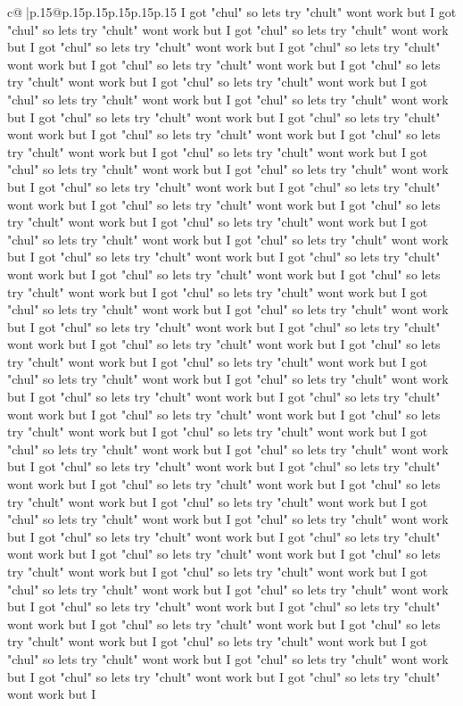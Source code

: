 \documentclass{article}
\begin{document}
{\begin{supertabular}{c@{$\;$}|p{.15\linewidth}@{}p{.15\linewidth}p{.15\linewidth}p{.15\linewidth}p{.15\linewidth}p{.15\linewidth}}
{{{I got "chul" so lets try "chult" wont work but I got "chul" so lets try "chult" wont work but I got "chul" so lets try "chult" wont work but I got "chul" so lets try "chult" wont work but I got "chul" so lets try "chult" wont work but I got "chul" so lets try "chult" wont work but I got "chul" so lets try "chult" wont work but I got "chul" so lets try "chult" wont work but I got "chul" so lets try "chult" wont work but I got "chul" so lets try "chult" wont work but I got "chul" so lets try "chult" wont work but I got "chul" so lets try "chult" wont work but I got "chul" so lets try "chult" wont work but I got "chul" so lets try "chult" wont work but I got "chul" so lets try "chult" wont work but I got "chul" so lets try "chult" wont work but I got "chul" so lets try "chult" wont work but I got "chul" so lets try "chult" wont work but I got "chul" so lets try "chult" wont work but I got "chul" so lets try "chult" wont work but I got "chul" so lets try "chult" wont work but I got "chul" so lets try "chult" wont work but I got "chul" so lets try "chult" wont work but I got "chul" so lets try "chult" wont work but I got "chul" so lets try "chult" wont work but I got "chul" so lets try "chult" wont work but I got "chul" so lets try "chult" wont work but I got "chul" so lets try "chult" wont work but I got "chul" so lets try "chult" wont work but I got "chul" so lets try "chult" wont work but I got "chul" so lets try "chult" wont work but I got "chul" so lets try "chult" wont work but I got "chul" so lets try "chult" wont work but I got "chul" so lets try "chult" wont work but I got "chul" so lets try "chult" wont work but I got "chul" so lets try "chult" wont work but I got "chul" so lets try "chult" wont work but I got "chul" so lets try "chult" wont work but I got "chul" so lets try "chult" wont work but I got "chul" so lets try "chult" wont work but I got "chul" so lets try "chult" wont work but I got "chul" so lets try "chult" wont work but I got "chul" so lets try "chult" wont work but I got "chul" so lets try "chult" wont work but I got "chul" so lets try "chult" wont work but I got "chul" so lets try "chult" wont work but I got "chul" so lets try "chult" wont work but I got "chul" so lets try "chult" wont work but I got "chul" so lets try "chult" wont work but I got "chul" so lets try "chult" wont work but I got "chul" so lets try "chult" wont work but I got "chul" so lets try "chult" wont work but I got "chul" so lets try "chult" wont work but I got "chul" so lets try "chult" wont work but I got "chul" so lets try "chult" wont work but I got "chul" so lets try "chult" wont work but I got "chul" so lets try "chult" wont work but I got "chul" so lets try "chult" wont work but I got "chul" so lets try "chult" wont work but I got "chul" so lets try "chult" wont work but I got "chul" so lets try "chult" wont work but I got "chul" so lets try "chult" wont work but I got "chul" so lets try "chult" wont work but I got "chul" so lets try "chult" wont work but I got "chul" so lets try "chult" wont work but I got "chul" so lets try "chult" wont work but I got "chul" so lets try "chult" wont work but I got "chul" so lets try "chult" wont work but I }}}
\end{supertabular}}
\end{document}
